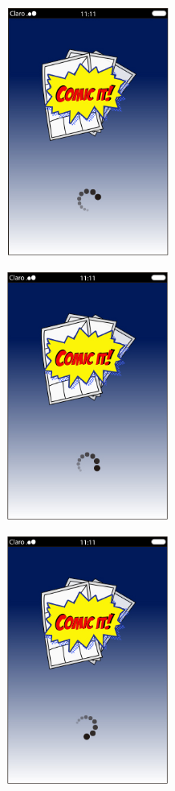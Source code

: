 \documentclass[utf8]{beamer}
\begin{document}
	\begin{frame}
		\begin{center} 
			 \includegraphics[width=0.4\textwidth]{demo1.jpg}
		\end{center}
	\end{frame}
	\begin{frame}
		\begin{center} 
			 \includegraphics[width=0.4\textwidth]{demo2.jpg}
		\end{center}
	\end{frame}
	\begin{frame}
		\begin{center} 
			 \includegraphics[width=0.4\textwidth]{demo3.jpg}
		\end{center}
	\end{frame}
\end{document}
